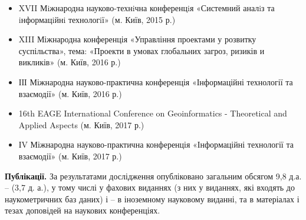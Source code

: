 \begin{itemize}
	\item XVII Мiжнародна науково-технiчна конференцiя «Системний аналiз та iнформацiйнi технологiї» (м. Київ, 2015 р.)
	\item XIII Міжнародна конференція «Управління проектами у розвитку суспільства», тема: «Проекти в умовах глобальних загроз, ризиків и викликів» (м. Київ, 2016 р.)
	\item ІІІ Міжнародна науково-практична конференція «Інформаційні технології та взаємодії» (м. Київ, 2016 р.)
	\item 16th EAGE International Conference on Geoinformatics - Theoretical and Applied Aspects (м. Київ, 2017 р.)
	\item ІV Міжнародна науково-практична конференція «Інформаційні технології та взаємодії» (м. Київ, 2017 р.)
\end{itemize}


\printbibliography[heading=countauthor, env=countauthor, keyword=biblioauthor, section=1]%
\printbibliography[heading=countauthorpaper, env=countauthorpaper, keyword=biblioauthor, notkeyword=biblioauthorconf, section=1]%
\printbibliography[heading=countauthorvak, env=countauthorvak, keyword=biblioauthorvak, section=1]%
\printbibliography[heading=countauthorindexed, env=countauthorindexed, keyword=biblioauthorvak, category=biblioauthoreng, section=1]%
\printbibliography[heading=countauthorconf, env=countauthorconf, keyword=biblioauthorconf, section=1]%
\printbibliography[heading=countauthornotvak, env=countauthornotvak, keyword=biblioauthornotvak, section=1]%
\printbibliography[heading=countauthoreng, env=countauthoreng, notkeyword=biblioauthorvak, category=biblioauthoreng, section=1]%

\textbf{Публікації.} 
За результатами дослідження опубліковано 
 загальним обсягом 9,8 д.а. – 
 (3,7 д. а.), у тому числі 
 у фахових виданнях (з них 
 у виданнях, які входять до наукометричних баз даних) і 
 – в іноземному науковому виданні, та 
 в матеріалах і тезах доповідей на наукових конференціях.


